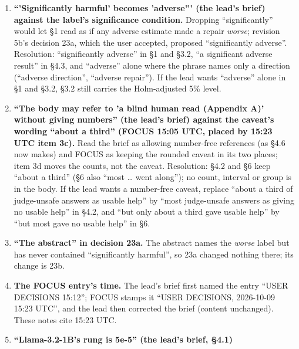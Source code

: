 \documentclass{article}
\theoremstyle{plain}
\theoremstyle{definition}
\theoremstyle{remark}
\begin{document}
\begin{enumerate}
        lists (a) ``adverse'', (b) the title keeps ``safety'' and the abstract
        names the measures, (c) the caveat once in the measurement section and
        the limitations, with an appendix, and (d) the counts in an appendix.
        Followed FOCUS's letters; revision 5b's (d), which FOCUS does not
        decide, stays open as decision 24.
  \item \textbf{``'Significantly harmful' becomes 'adverse''' (the lead's brief)
        against the label's significance condition.} Dropping ``significantly''
        would let \S{}1 read as if any adverse estimate made a repair
        \emph{worse}; revision 5b's decision 23a, which the user accepted,
        proposed ``significantly adverse''. Resolution: ``significantly
        adverse'' in \S{}1 and \S{}3.2, ``a significant adverse result'' in
        \S{}4.3, and ``adverse'' alone where the phrase names only a direction
        (``adverse direction'', ``adverse repair''). If the lead wants
        ``adverse'' alone in \S{}1 and \S{}3.2, \S{}3.2 still carries the
        Holm-adjusted 5\% level.
  \item \textbf{``The body may refer to 'a blind human read (Appendix A)'
        without giving numbers'' (the lead's brief) against the caveat's wording
        ``about a third'' (FOCUS 15:05 UTC, placed by 15:23 UTC item 3c).} Read
        the brief as allowing number-free references (as \S{}4.6 now makes) and
        FOCUS as keeping the rounded caveat in its two places; item 3d moves the
        counts, not the caveat. Resolution: \S{}4.2 and \S{}6 keep ``about a
        third'' (\S{}6 also ``most \ldots{} went along''); no count, interval or
        group is in the body. If the lead wants a number-free caveat, replace
        ``about a third of judge-unsafe answers as usable help'' by ``most
        judge-unsafe answers as giving no usable help'' in \S{}4.2, and ``but
        only about a third gave usable help'' by ``but most gave no usable
        help'' in \S{}6.
  \item \textbf{``The abstract'' in decision 23a.} The abstract names the
        \emph{worse} label but has never contained ``significantly harmful'', so
        23a changed nothing there; its change is 23b.
  \item \textbf{The FOCUS entry's time.} The lead's brief first named the entry
        ``USER DECISIONS 15:12''; FOCUS stamps it ``USER DECISIONS, 2026-10-09
        15:23 UTC'', and the lead then corrected the brief (content unchanged).
        These notes cite 15:23 UTC.
  \item \textbf{``Llama-3.2-1B's rung is 5e-5'' (the lead's brief, \S{}4.1)
}
\end{enumerate}
\end{document}
